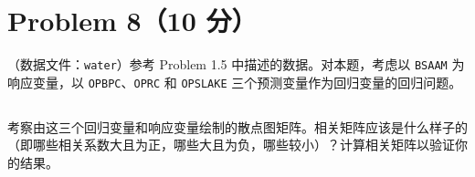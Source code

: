 \documentclass[12pt,a4paper]{article}
\begin{document}
\section{Problem 8（10 分）}

（数据文件：\texttt{water}）参考 Problem 1.5 中描述的数据。对本题，考虑以 \texttt{BSAAM} 为响应变量，以 \texttt{OPBPC}、\texttt{OPRC} 和 \texttt{OPSLAKE} 三个预测变量作为回归变量的回归问题。

\subsection{}

考察由这三个回归变量和响应变量绘制的散点图矩阵。相关矩阵应该是什么样子的（即哪些相关系数大且为正，哪些大且为负，哪些较小）？计算相关矩阵以验证你的结果。
\end{document}

